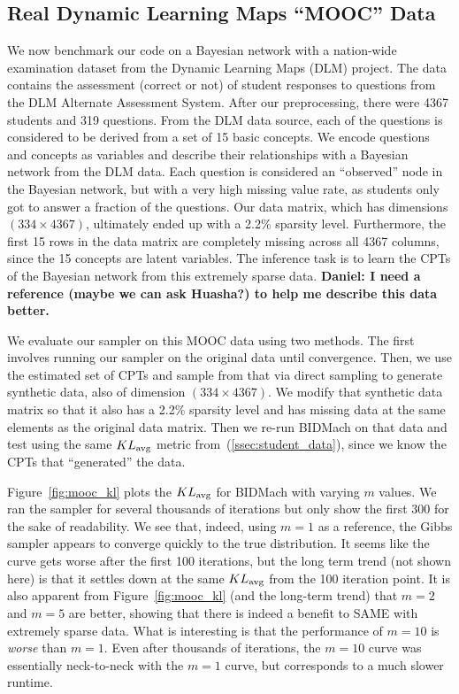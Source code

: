 \documentclass{article} %
\begin{document}
\subsection{Real Dynamic Learning Maps ``MOOC'' Data}\label{ssec:mooc_data}

We now benchmark our code on a Bayesian network with a nation-wide examination dataset from the
Dynamic Learning Maps (DLM) project. The data contains the assessment (correct or not) of student
responses to questions from the DLM Alternate Assessment System. After our preprocessing, there were
4367 students and 319 questions. From the DLM data source, each of the questions is considered to be
derived from a set of 15 basic concepts. We encode questions and concepts as variables and describe
their relationships with a Bayesian network from the DLM data. Each question is considered an
``observed'' node in the Bayesian network, but with a very high missing value rate, as students only
got to answer a fraction of the questions.  Our data matrix, which has dimensions $(334\times
4367)$, ultimately ended up with a 2.2\% sparsity level. Furthermore, the first 15 rows in the data
matrix are completely missing across all 4367 columns, since the 15 concepts are latent variables. The
inference task is to learn the CPTs of the Bayesian network from this extremely sparse data.
\textbf{Daniel: I need a reference (maybe we can ask Huasha?) to help me describe this data better.}

We evaluate our sampler on this MOOC data using two methods. The first involves running our sampler
on the original data until convergence. Then, we use the estimated set of CPTs and sample from that
via direct sampling to generate synthetic data, also of dimension $(334 \times 4367)$. We modify
that synthetic data matrix so that it also has a 2.2\% sparsity level and has missing data at the
same elements as the original data matrix. Then we re-run BIDMach on that data and test using the
same $KL_{\rm avg}$ metric from~(\ref{ssec:student_data}), since we know the CPTs that ``generated''
the data.

Figure~\ref{fig:mooc_kl} plots the $KL_{\rm avg}$ for BIDMach with varying $m$ values. We ran the
sampler for several thousands of iterations but only show the first 300 for the sake of readability.
We see that, indeed, using $m=1$ as a reference, the Gibbs sampler appears to converge quickly to
the true distribution. It seems like the curve gets worse after the first 100 iterations, but
the long term trend (not shown here) is that it settles down at the same $KL_{\rm avg}$ from the 100
iteration point. It is also apparent from Figure~\ref{fig:mooc_kl} (and the long-term trend) that
$m=2$ and $m=5$ are better, showing that there is indeed a benefit to SAME with extremely sparse
data. What is interesting is that the performance of $m=10$ is \emph{worse} than $m=1$. Even after
thousands of iterations, the $m=10$ curve was essentially neck-to-neck with the $m=1$ curve, but
corresponds to a much slower runtime.
\end{document}
